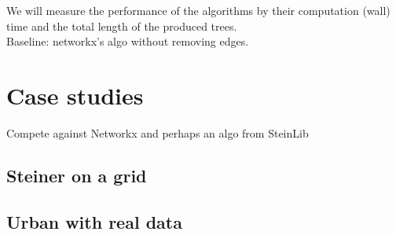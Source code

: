 \documentclass[12pt]{article}
\begin{document}
We will measure the performance of the algorithms by their computation (wall) time and the total length of the produced trees. \\

\noindent Baseline: networkx's algo without removing edges. 

\section{Case studies}

Compete against Networkx and perhaps an algo from SteinLib

\subsection{Steiner on a grid}

\subsection{Urban with real data}
\end{document}
